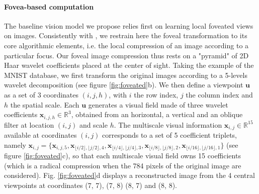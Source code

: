 \documentclass{article}
\begin{document}
\paragraph{Fovea-based computation} 
The baseline vision model we propose relies first on learning local foveated views on images.
Consistently with \cite{kortum1996implementation,wang2003foveation}, we restrain here the foveal transformation to its core algorithmic elements, i.e. the local compression of an image according to a particular focus. Our foveal image compression thus rests on a "pyramid" of 2D Haar wavelet coefficients placed at the center of sight. Taking the example of the MNIST database, we first transform the original images according to a 5-levels wavelet decomposition (see figure \ref{fig:foveated}b). We then define a viewpoint $\boldsymbol{u}$ as a set of 3 coordinates $(i,j,h)$, with $i$ the row index, $j$ the column index and $h$ the spatial scale. Each $\boldsymbol{u}$ generates a visual field made of three wavelet coefficients $\boldsymbol{x}_{i,j,h} \in \mathbb{R}^3$, obtained from an horizontal, a vertical and an oblique filter at location $(i,j)$ and scale $h$.  The multiscale visual information $\boldsymbol{x}_{i,j} \in \mathbb{R}^{15}$ available at coordinates $(i,j)$ corresponds to a set of 5 coefficient triplets, namely $\boldsymbol{x}_{i,j}=\{\boldsymbol{x}_{i,j,5}, \boldsymbol{x}_{\lfloor i/2\rfloor,\lfloor j/2\rfloor,4}, \boldsymbol{x}_{\lfloor i/4\rfloor,\lfloor j/4\rfloor,3}, \boldsymbol{x}_{\lfloor i/8\rfloor,\lfloor j/8\rfloor, 2}, \boldsymbol{x}_{\lfloor i/16\rfloor,\lfloor j/16\rfloor, 1}\}$ (see figure \ref{fig:foveated}c), so that each multiscale visual field owns 15 coefficients (which is a radical compression when the 784 pixels of the original image are considered).
Fig. \ref{fig:foveated}d displays a reconstructed image from the 4 central viewpoints at coordinates (7, 7), (7, 8) (8, 7) and (8, 8).
\end{document}
